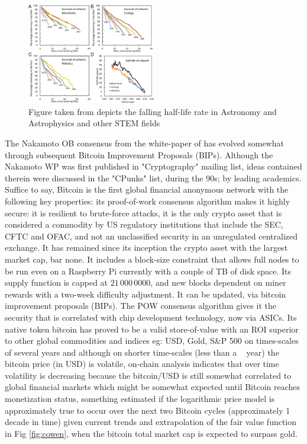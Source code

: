 \documentclass[final,5p,times,twocolumn,authoryear]{elsarticle}
\begin{document}
\begin{figure}[h!]
    \centering
  \caption{Figure taken from \cite{milo_2018} depicts the falling half-life rate in Astronomy and Astrophysics and other STEM fields}
  \label{fig:F4.large}
  \includegraphics[width=0.5\textwidth]{figs/F4.large.jpg}
\end{figure}
The Nakamoto OB consensus from the white-paper of \cite{nak2009} has evolved somewhat through subsequent Bitcoin Improvement Proposals (BIPs). Although the Nakamoto WP was first published in "Cryptography" mailing list, ideas contained therein were discussed in the "CPunks" list, during the 90s; by leading academics. Suffice to say, Bitcoin is the first global financial anonymous network with the following key properties: its proof-of-work consensus algorithm makes it highly secure: it is resilient to brute-force attacks, it is the only crypto asset that is considered a commodity by US regulatory institutions that include the SEC, CFTC and OFAC, and not an unclassified security in an unregulated centralized exchange. It has remained since its inception the crypto asset with the largest market cap, bar none. It includes a block-size constraint that allows full nodes to be run even on a Raspberry Pi currently with a couple of TB of disk space. Its supply function is capped at $21\,000\,0000$, and new blocks dependent on miner rewards with a two-week difficulty adjustment. It can be updated, via bitcoin improvement proposals (BIPs). The POW consensus algorithm gives it the security that is correlated with chip development technology, now via ASICs. Its native token bitcoin has proved to be a valid store-of-value with an ROI superior to other global commodities and indices eg: USD, Gold, S\&P 500 on times-scales of several years and although on shorter time-scales (less than a ~ year) the bitcoin price (in USD) is  volatile, on-chain analysis indicates that over time volatility is decreasing because the bitcoin/USD is still somewhat correlated to global financial markets  \citep{wang2022} which might be somewhat expected until Bitcoin reaches monetization status, something estimated if the logarithmic price model is approximately true to occur over the next two Bitcoin cycles (approximately 1 decade in time) given current trends and extrapolation of the fair value function in Fig \ref{fig:cowen},  when the bitcoin total market cap is expected to surpass gold. 
\end{document}
